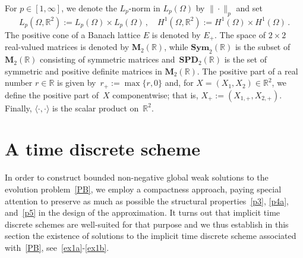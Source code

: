 \documentclass[AHL,Unicode,longabstracts,published]{cedram}
\newcommand{\bbR}{\mathbb{R}}
\newcommand{\bfM}{\mathbf{M}}
\newcommand{\bSym}{\mathbf{Sym}}
\newcommand{\bSPD}{\mathbf{SPD}}
\begin{document}

\begin{nota}
For $p\in [1,\infty]$, we denote the $L_p$-norm in $L_p(\Omega)$ by $\|\cdot\|_p$ and set
\begin{equation*}
L_p\left(\Omega,\bbR^2\right) := L_p(\Omega)\times L_p(\Omega)\,, \quad H^1\left(\Omega,\bbR^2\right):= H^1(\Omega)\times H^1(\Omega)\,.
\end{equation*}
The positive cone of a Banach lattice $E$ is denoted by $E_+$. The space of $2\times 2$ real-valued matrices is denoted by ${\bfM_2(\bbR)}$, while ${\bSym_2(\bbR)}$ is the subset of ${\bfM_2(\bbR)}$ consisting of symmetric matrices and~${\bSPD_2(\bbR)}$ is the set of symmetric and positive definite matrices in $\bfM_2(\bbR)$. The positive part of a real number $r\in\bbR$ is given by~${r_+:=\max\{r,0\}}$ and, for $X=(X_1,X_2)\in\bbR^2$, we define the positive part of~$X$ componentwise; that is, ${X_+:=(X_{1,+}, X_{2,+})}$. Finally, $\langle \cdot,\cdot \rangle$ is the scalar product on~$\bbR^2$.
\end{nota}


\section{A time discrete scheme}\label{sec2}



In order to construct bounded non-negative global weak solutions to the evolution problem~\eqref{PB}, we employ a compactness approach, paying special attention to preserve as much as possible the structural properties~\eqref{p3}, \eqref{p4a}, and~\eqref{p5} in the design of the approximation. It turns out that implicit time discrete schemes are well-suited for that purpose and we thus establish in this section the existence of solutions to the implicit time discrete scheme associated with~\eqref{PB}, see~\eqref{ex1a}-\eqref{ex1b}.
\end{document}
